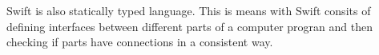 \documentclass[11pt]{article}
\begin{document}
Swift is also statically typed language. This is means with Swift consits of defining interfaces between different parts of a computer progran and then checking if parts have connections in a consistent way.








\end{document}
